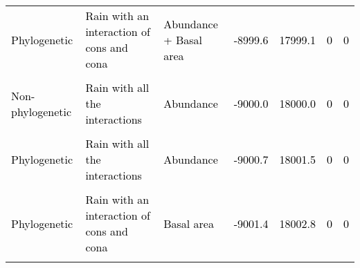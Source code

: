 \documentclass[
  12pt,
  letterpaper,
  DIV=11,
  numbers=noendperiod]{scrartcl}
\begin{document}
\begin{table}[H]
{\begin{tabular}[t]{lllllll}
\textcolor{black}{Phylogenetic} & \textcolor{black}{Rain with an interaction of cons and cona} & \textcolor{black}{Abundance + Basal area} & \textcolor{black}{-8999.6} & \textcolor{black}{17999.1} & \textcolor{black}{0} & \textcolor{black}{0}\\
\cellcolor{gray!6}{\textcolor{black}{Phylogenetic}} & \cellcolor{gray!6}{\textcolor{black}{Rain with an interaction of cona}} & \cellcolor{gray!6}{\textcolor{black}{Basal area}} & \cellcolor{gray!6}{\textcolor{black}{-8999.9}} & \cellcolor{gray!6}{\textcolor{black}{17999.7}} & \cellcolor{gray!6}{\textcolor{black}{0}} & \cellcolor{gray!6}{\textcolor{black}{0}}\\
\textcolor{black}{Non-phylogenetic} & \textcolor{black}{Rain with all the interactions} & \textcolor{black}{Abundance} & \textcolor{black}{-9000.0} & \textcolor{black}{18000.0} & \textcolor{black}{0} & \textcolor{black}{0}\\
\addlinespace
\cellcolor{gray!6}{\textcolor{black}{Non-phylogenetic}} & \cellcolor{gray!6}{\textcolor{black}{Rain with an interaction of cona}} & \cellcolor{gray!6}{\textcolor{black}{Basal area}} & \cellcolor{gray!6}{\textcolor{black}{-9000.1}} & \cellcolor{gray!6}{\textcolor{black}{18000.3}} & \cellcolor{gray!6}{\textcolor{black}{0}} & \cellcolor{gray!6}{\textcolor{black}{0}}\\
\textcolor{black}{Phylogenetic} & \textcolor{black}{Rain with all the interactions} & \textcolor{black}{Abundance} & \textcolor{black}{-9000.7} & \textcolor{black}{18001.5} & \textcolor{black}{0} & \textcolor{black}{0}\\
\cellcolor{gray!6}{\textcolor{black}{Non-phylogenetic}} & \cellcolor{gray!6}{\textcolor{black}{Rain with an interaction of cons and cona}} & \cellcolor{gray!6}{\textcolor{black}{Basal area}} & \cellcolor{gray!6}{\textcolor{black}{-9001.1}} & \cellcolor{gray!6}{\textcolor{black}{18002.2}} & \cellcolor{gray!6}{\textcolor{black}{0}} & \cellcolor{gray!6}{\textcolor{black}{0}}\\
\textcolor{black}{Phylogenetic} & \textcolor{black}{Rain with an interaction of cons and cona} & \textcolor{black}{Basal area} & \textcolor{black}{-9001.4} & \textcolor{black}{18002.8} & \textcolor{black}{0} & \textcolor{black}{0}\\
\cellcolor{gray!6}{\textcolor{black}{Phylogenetic}} & \cellcolor{gray!6}{\textcolor{black}{Rain with all the interactions}} & \cellcolor{gray!6}{\textcolor{black}{Basal area}} & \cellcolor{gray!6}{\textcolor{black}{-9003.3}} & \cellcolor{gray!6}{\textcolor{black}{18006.6}} & \cellcolor{gray!6}{\textcolor{black}{0}} & \cellcolor{gray!6}{\textcolor{black}{0}}\\

\end{tabular}}
\end{table}
\end{document}
